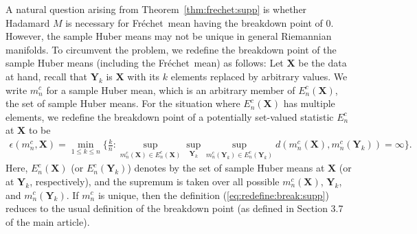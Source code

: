 \documentclass[preprint]{imsart}
\newcommand{\bX}{\mathbf{X}}
\def\Frechet{Fr\'{e}chet}
\theoremstyle{plain}
\theoremstyle{remark}
\begin{document}
\begin{appendix}
A natural question arising from Theorem~\ref{thm:frechet:supp} is whether Hadamard $M$ is necessary for \Frechet\ mean having the breakdown point of 0. However, the sample Huber means may not be unique in general Riemannian manifolds. To circumvent the problem, we redefine the breakdown point of the sample Huber means (including the \Frechet\ mean) as follows: 
Let $\bX$ be the data at hand, recall that $\mathbf{Y}_{k}$ is $\bX$ with its $k$ elements replaced by arbitrary values. 
We write $m^{c}_{n}$ for a sample Huber mean, which is an arbitrary member of $E^{c}_{n}(\mathbf{X})$, the set of sample Huber means. 
For the situation where $E_n^c(\mathbf{X})$ has multiple elements, we redefine the breakdown point of a potentially set-valued statistic $E_n^c$ at $\textbf{X}$ to be 
%
\begin{eqnarray}
\epsilon(m^{c}_{n}, \mathbf{X}) = \min_{1\le k\le n}\{\frac{k}{n}: \sup_{m^{c}_{n}(\mathbf{X}) \in E^{c}_{n}(\mathbf{X})} \sup_{\mathbf{Y}_{k}}\sup_{m^{c}_{n}(\mathbf{Y}_{k}) \in E^{c}_{n}(\mathbf{Y}_{k})} d(m^{c}_{n}(\mathbf{X}), m^{c}_{n}(\mathbf{Y}_{k})) = \infty \}.
\label{eq:redefine:break:supp}
\end{eqnarray}
Here, $E^{c}_{n}(\mathbf{X})$ (or $E^{c}_{n}(\mathbf{Y}_{k})$) denotes by the set of sample Huber means at $\mathbf{X}$ (or at $\mathbf{Y}_{k}$, respectively), and the supremum is taken over all possible $m^{c}_{n}(\mathbf{X})$, $\mathbf{Y}_{k}$, and  $m^{c}_{n}(\mathbf{Y}_{k})$. If $m_n^c$ is unique, then the definition (\ref{eq:redefine:break:supp}) reduces to the usual definition of the breakdown point (as defined in Section 3.7 of the main article). 

 






\end{appendix}
\end{document}
